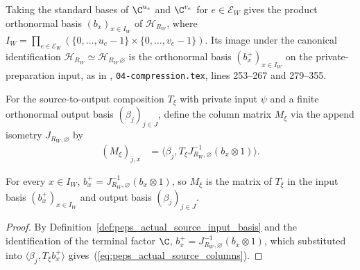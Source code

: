 \begin{definition}
    \label{def:peps_actual_source_input_basis}
    \leanok
    Taking the standard bases of $\C^{u_e}$ and $\C^{v_e}$ for $e\in\mathcal E_W$
    gives the product orthonormal basis $(b_x)_{x\in I_W}$ of $\mathcal H_{R_W}$,
    where
    $I_W=\prod_{e\in\mathcal E_W}(\{0,\ldots,u_e-1\}\times\{0,\ldots,v_e-1\})$.
    Its image under the canonical identification
    $\mathcal H_{R_W}\simeq\mathcal H_{R_W\,\varnothing}$ is the orthonormal
    basis $(b_x^+)_{x\in I_W}$ on the private-preparation input, as in
    \cite[proof of Theorem~5.2]{OpenAI2026PolynomialPEPS},
    \texttt{04-compression.tex}, lines 253--267 and 279--355.
\end{definition}

\begin{definition}
    \label{def:peps_actual_source_column_matrix}
    \leanok
    For the source-to-output composition $T_\xi$ with private input $\psi$ and
    a finite orthonormal output basis $(\beta_j)_{j\in J}$, define the column
    matrix $M_\xi$ via the append isometry $J_{R_W,\varnothing}$ by
    \begin{align}
        (M_\xi)_{j,x}
         & =\langle\beta_j,T_\xi J_{R_W,\varnothing}^{-1}
        (b_x\otimes1)\rangle.
        \label{eq:peps_actual_source_columns}
    \end{align}
\end{definition}

\begin{lemma}
    \label{thm:peps_actual_source_column_coordinates}
    \leanok
    For every $x\in I_W$, $b_x^+=J_{R_W,\varnothing}^{-1}(b_x\otimes1)$, so
    $M_\xi$ is the matrix of $T_\xi$ in the input basis $(b_x^+)_{x\in I_W}$
    and output basis $(\beta_j)_{j\in J}$.
\end{lemma}

\begin{proof}\leanok
    By Definition~\ref{def:peps_actual_source_input_basis} and
    the identification of the terminal factor $\C$,
    $b_x^+=J_{R_W,\varnothing}^{-1}(b_x\otimes1)$, which substituted into
    $\langle\beta_j,T_\xi b_x^+\rangle$ gives~(\ref{eq:peps_actual_source_columns}).
\end{proof}

